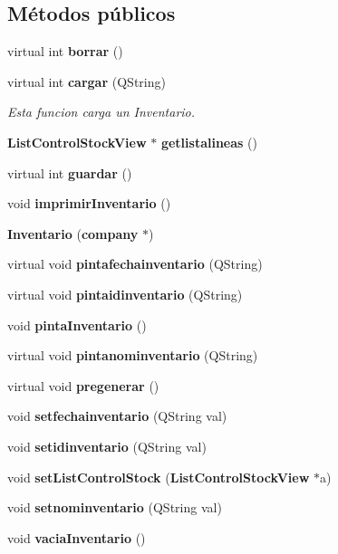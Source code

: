 \subsection*{M\'{e}todos p\'{u}blicos}
\begin{CompactItemize}
\item 
virtual int {\bf borrar} ()\label{classInventario_a0}

\item 
virtual int {\bf cargar} (QString)\label{classInventario_a1}

\begin{CompactList}\small\item\em Esta funcion carga un Inventario. \item\end{CompactList}\item 
{\bf List\-Control\-Stock\-View} $\ast$ {\bf getlistalineas} ()\label{classInventario_a2}

\item 
virtual int {\bf guardar} ()\label{classInventario_a3}

\item 
void {\bf imprimir\-Inventario} ()\label{classInventario_a4}

\item 
{\bf Inventario} ({\bf company} $\ast$)\label{classInventario_a5}

\item 
virtual void {\bf pintafechainventario} (QString)\label{classInventario_a6}

\item 
virtual void {\bf pintaidinventario} (QString)\label{classInventario_a7}

\item 
void {\bf pinta\-Inventario} ()
\item 
virtual void {\bf pintanominventario} (QString)\label{classInventario_a9}

\item 
virtual void {\bf pregenerar} ()\label{classInventario_a10}

\item 
void {\bf setfechainventario} (QString val)\label{classInventario_a11}

\item 
void {\bf setidinventario} (QString val)\label{classInventario_a12}

\item 
void {\bf set\-List\-Control\-Stock} ({\bf List\-Control\-Stock\-View} $\ast$a)\label{classInventario_a13}

\item 
void {\bf setnominventario} (QString val)\label{classInventario_a14}

\item 
void {\bf vacia\-Inventario} ()\label{classInventario_a15}

\end{CompactItemize}
